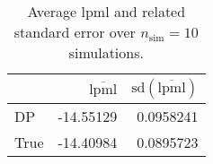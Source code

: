 \begin{table}[H]

\caption{Average lpml and related standard error over $n_{\text{sim}} = 10$ simulations.}
\centering
\begin{tabular}[t]{lrr}
\toprule
  & $\overbar{\text{lpml}}$ & $\text{sd}(\overbar{\text{lpml}})$\\
\midrule
DP & -14.55129 & 0.0958241\\
True & -14.40984 & 0.0895723\\
\bottomrule
\end{tabular}
\end{table}